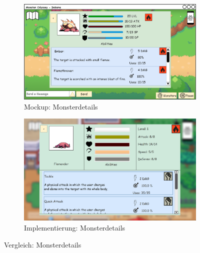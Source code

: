 \begin{figure}[H]
    \centering
    \begin{subfigure}[b]{0.4\textwidth}
        \includegraphics[width=\textwidth]{images/mockups/Monster/IngameMonsterDetails.png}
        \caption{Mockup: \phantom{aaamonsterr} Monsterdetails}
        \label{fig: Mockup: Monsterdetails}
    \end{subfigure}
    \hfill
    \begin{subfigure}[b]{0.4\textwidth}
        \includegraphics[width=\textwidth]{images/implementation/Monster/Monsterdetails .png}
        \caption{Implementierung: Monsterdetails}
        \label{fig: Implementierung: Monsterdetails}
    \end{subfigure}
    \caption{Vergleich: Monsterdetails}
    \label{fig: Vergleich: Monsterdetails}
\end{figure}